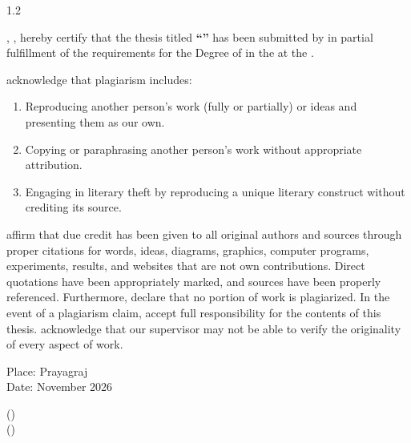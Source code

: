 \begin{spacing}{1.2}

\noindent \pronounwe, \studentnamesdeclaration, hereby certify that the thesis titled \textbf{\enquote{\ttitle}} has been submitted by \pronounme{} in partial fulfillment of the requirements for the Degree of \degreename{} in the \deptname{} at the \univname.

\par
\noindent \pronounwe{} acknowledge that plagiarism includes: 
\begin{enumerate} 
    \item Reproducing another person's work (fully or partially) or ideas and presenting them as our own.
    \item Copying or paraphrasing another person's work without appropriate attribution.
    \item Engaging in literary theft by reproducing a unique literary construct without crediting its source.
\end{enumerate}
\par
\pronounwe{} affirm that due credit has been given to all original authors and sources through proper citations for words, ideas, diagrams, graphics, computer programs, experiments, results, and websites that are not \pronounour{} own contributions. Direct quotations have been appropriately marked, and sources have been properly referenced. Furthermore, \pronounwe{} declare that no portion of \pronounour{} work is plagiarized. In the event of a plagiarism claim, \pronounwe{} accept full responsibility for the contents of this thesis. \pronounwe{} acknowledge that our supervisor may not be able to verify the originality of every aspect of \pronounour{} work.
\end{spacing}

\vspace{1.5cm}
\noindent
\begin{minipage}[t]{0.4\textwidth}  
    \begin{flushleft} 
        Place: Prayagraj\\[2mm]
        Date: November 2026
    \end{flushleft}
\end{minipage}
\hfill
\begin{minipage}[t]{0.5\textwidth}
    \begin{flushright}         
        \textbf{\studentonename} (\studentoneroll)\\[4mm]
        \textbf{\studenttwoname} (\studenttworoll)
    \end{flushright}
\end{minipage}


